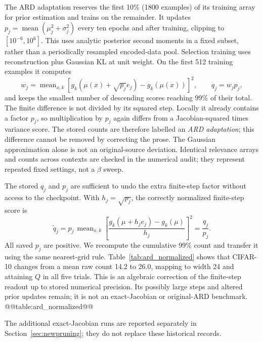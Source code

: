 The ARD adaptation reserves the first 10\% (1800 examples) of its
training array for prior estimation and trains on the remainder.
It updates $p_j=\operatorname{mean}(\mu_j^2+\sigma_j^2)$ every ten
epochs and after training, clipping to $[10^{-6},10^6]$.
This uses analytic posterior second moments in a fixed subset, rather
than a periodically resampled encoded-data pool. Selection training uses
reconstruction plus Gaussian KL at unit weight. On the first 512
training examples it computes
\begin{equation}
 w_j=\operatorname{mean}_{x,k}
 [g_k(\mu(x)+\sqrt{p_j}e_j)-g_k(\mu(x))]^2,
 \qquad q_j=w_jp_j,
 \label{eq:ardlocal}
\end{equation}
and keeps the smallest number of descending scores reaching 99\% of
their total. The finite difference is not divided by its squared step.
Locally it already contains a factor $p_j$, so multiplication by $p_j$
again differs from a Jacobian-squared times variance score. The stored
counts are therefore labelled an \emph{ARD adaptation}; this difference
cannot be removed by correcting the prose. The Gaussian approximation
alone is not an original-source deviation. Identical relevance arrays
and counts across contexts are checked in the numerical audit; they
represent repeated fixed settings, not a $\beta$ sweep.

The stored $q_j$ and $p_j$ are sufficient to undo the extra finite-step
factor without access to the checkpoint. With $h_j=\sqrt{p_j}$, the
correctly normalized finite-step score is
\begin{equation}
 \widetilde q_j
 =p_j\,\operatorname{mean}_{x,k}
 \left[\frac{g_k(\mu+h_je_j)-g_k(\mu)}{h_j}\right]^2
 =\frac{q_j}{p_j}.
 \label{eq:ardcorrected}
\end{equation}
All saved $p_j$ are positive. We recompute the cumulative 99\% count
and transfer it using the same nearest-grid rule. Table~\ref{tab:ard_normalized}
shows that CIFAR-10 changes from a mean raw count 14.2 to 26.0,
mapping to width 24 and attaining $Q$ in all five trials. This is an
algebraic correction of the finite-step readout up to stored numerical
precision. Its
possibly large steps and altered prior updates remain; it is not
an exact-Jacobian or original-ARD benchmark.
@@table:ard_normalized@@

The additional exact-Jacobian runs are reported separately in
Section~\ref{sec:newpruning}; they do not replace these historical records.

